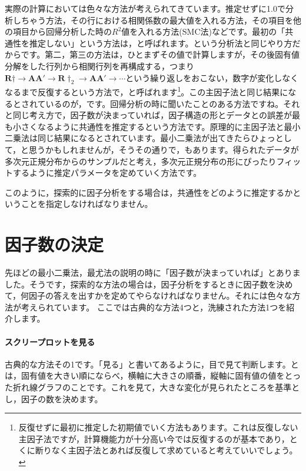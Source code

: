 \documentclass{ltjsbook}
\begin{document}
実際の計算においては色々な方法が考えられてきています。推定せずに1.0で分析しちゃう方法，その行における相関係数の最大値を入れる方法，その項目を他の項目から回帰分析した時の$R^2$値を入れる方法(SMC法)などです。最初の「共通性を推定しない」という方法は，と呼ばれます。という分析法と同じやり方だからです。第二，第三の方法は，ひとまずその値で計算しますが，その後固有値分解をした行列から相関行列を再構成する，つまり$\bm{R}\dagger \to \bm{AA'} \to \bm{R}\dagger_2 \to \bm{AA'} \to \cdots $という繰り返しをおこない，数字が変化しなくなるまで反復するという方法で，と呼ばれます\footnote{反復せずに最初に推定した初期値でいく方法もあります。これは反復しない主因子法ですが，計算機能力が十分高い今では反復するのが基本であり，とくに断りなく主因子法とあれば反復して求めていると考えていいでしょう。}。この主因子法と同じ結果になるとされているのが，です。回帰分析の時に聞いたことのある方法ですね。それと同じ考え方で，因子数が決まっていれば，因子構造の形とデータとの誤差が最も小さくなるように共通性を推定するという方法です。原理的に主因子法と最小二乗法は同じ結果になるとされています。最小二乗法が出てきたらひょっとして，と思うかもしれませんが，そうその通りで，もあります。得られたデータが多次元正規分布からのサンプルだと考え，多次元正規分布の形にぴったりフィットするように推定パラメータを定めていく方法です。

このように，探索的に因子分析をする場合は，共通性をどのように推定するかということを指定しなければなりません。

\section{因子数の決定}
先ほどの最小二乗法，最尤法の説明の時に「因子数が決まっていれば」とありました。そうです，探索的な方法の場合は，因子分析をするときに因子数を決めて，何因子の答えを出すかを定めてやらなければなりません。それには色々な方法が考えられています。
ここでは古典的な方法4つと，洗練された方法1つを紹介します。
\paragraph{スクリープロットを見る}古典的な方法その1です。「見る」と書いてあるように，目で見て判断します。とは，固有値を大きい順にならべ，横軸に大きさの順番，縦軸に固有値の値をとった折れ線グラフのことです。これを見て，大きな変化が見られたところを基準とし，因子の数を決めます。
\end{document}
